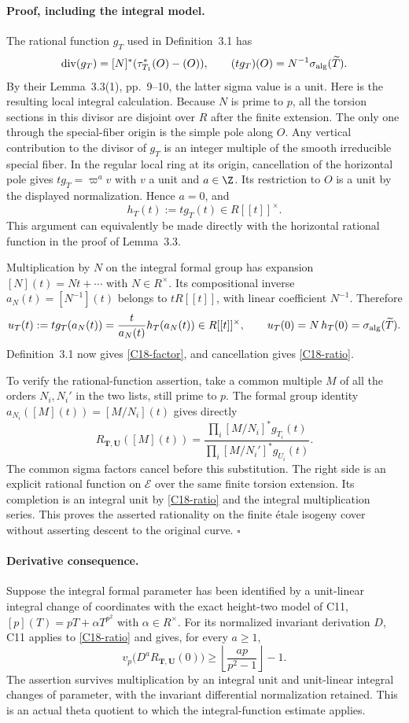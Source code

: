 \documentclass[11pt]{article}
\theoremstyle{definition}\newtheorem{definition}[theorem]{Definition}\newtheorem{remark}[theorem]{Remark}
\begin{document}
\paragraph{Proof, including the integral model.}
The rational function $g_T$ used in Definition~3.1 has
\[
 \operatorname{div}(g_T)=[N]^*(\tau_{T_1}^*(O)-(O)),\qquad
 (t g_T)(O)=N^{-1}\sigma_{\rm alg}(\widetilde T).
\]
By their Lemma~3.3(1), pp.~9--10, the latter sigma value is a
unit. Here is the resulting local integral calculation.
Because $N$ is prime to $p$, all the torsion sections in this
divisor are disjoint over $R$ after the finite extension. The
only one through the special-fiber origin is the simple pole
along $O$. Any vertical contribution to the divisor of $g_T$
is an integer multiple of the smooth irreducible special fiber.
In the regular local ring at its origin, cancellation of the
horizontal pole gives $t g_T=\varpi^a v$ with $v$ a unit and
$a\in\Z$. Its restriction to $O$ is a unit by the displayed
normalization. Hence $a=0$, and
\[
 h_T(t):=t g_T(t)\in R[[t]]^\times.
\]
This argument can equivalently be made directly with the
horizontal rational function in the proof of Lemma~3.3.

Multiplication by $N$ on the integral formal group has expansion
$[N](t)=Nt+\cdots$ with $N\in R^\times$. Its compositional inverse
$a_N(t)=[N^{-1}](t)$ belongs to $tR[[t]]$, with linear coefficient
$N^{-1}$. Therefore
\[
 u_T(t):=t g_T(a_N(t))
       =\frac{t}{a_N(t)}h_T(a_N(t))\in R[[t]]^\times,
 \qquad u_T(0)=N\,h_T(0)=\sigma_{\rm alg}(\widetilde T).
\]
Definition~3.1 now gives \eqref{C18-factor}, and cancellation
gives \eqref{C18-ratio}.

To verify the rational-function assertion, take a common multiple
$M$ of all the orders $N_i,N_i'$ in the two lists, still prime
to $p$. The formal group identity
$a_{N_i}([M](t))=[M/N_i](t)$ gives directly
\[
 R_{\mathbf T,\mathbf U}([M](t))=
 \frac{\prod_i[M/N_i]^*g_{T_i}(t)}
      {\prod_i[M/N_i']^*g_{U_i}(t)}.
\]
The common sigma factors cancel before this substitution.
The right side is an explicit rational function on $\mathcal E$
over the same finite torsion extension. Its completion is an
integral unit by \eqref{C18-ratio} and the integral multiplication
series. This proves the asserted rationality on the finite \'etale
isogeny cover without asserting descent to the original curve.
\hfill$\square$

\paragraph{Derivative consequence.}
Suppose the integral formal parameter has been identified by a
unit-linear integral change of coordinates with the exact height-two
model of C11, $[p](T)=pT+\alpha T^{p^2}$ with $\alpha\in R^\times$.
For its normalized invariant derivation $D$, C11 applies to
\eqref{C18-ratio} and gives, for every $a\geq1$,
\[
 v_p\bigl(D^a R_{\mathbf T,\mathbf U}(0)\bigr)
       \geq\left\lfloor\frac{ap}{p^2-1}\right\rfloor-1.
\]
The assertion survives multiplication by an integral unit and
unit-linear integral changes of parameter, with the invariant
differential normalization retained. This is an actual theta
quotient to which the integral-function estimate applies.
\end{document}

